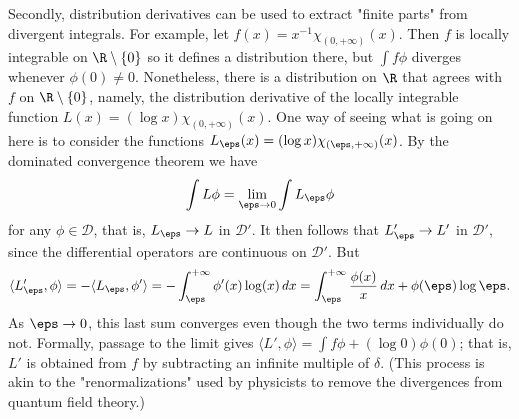 Secondly, distribution derivatives can be used to extract "finite parts" from divergent integrals. For example, let $f(x)=x^{-1}\chi_{(0,+\infty)} (x)$. Then $f$ is locally integrable on $\R\setminus\{0\}$ so it defines a distribution there, but $\int f\phi$ diverges whenever $\phi(0)\neq 0$. Nonetheless, there is a distribution on $\R$ that agrees with $f$ on $\R\setminus\{0\}$, namely, the distribution derivative of the locally integrable function $L(x)=(\log x)\chi_{(0,+\infty)}(x)$. One way of seeing what is going on here is to consider the functions $L_\eps(x)=(\log x)\chi_{(\eps,+\infty)}(x)$. By the dominated convergence theorem we have 
\[\int L\phi=\lim_{\eps\to 0}\int L_\eps\phi\]
for any $\phi\in\mathscr{D}$, that is, $L_\eps\to L$ in $\mathscr{D}'$. It then follows that $L_\eps'\to L'$ in $\mathscr{D}'$, since the differential operators are continuous on $\mathscr{D}'$. But
\[\langle L_\eps',\phi\rangle=-\langle L_\eps,\phi'\rangle=-\int_\eps^{+\infty}\phi'(x)\log(x)\,dx=\int_\eps^{+\infty}\frac{\phi(x)}{x}\,dx+\phi(\eps)\log\eps.\]
As $\eps\to 0$, this last sum converges even though the two terms individually do not. Formally, passage to the limit gives $\langle L',\phi\rangle=\int f\phi+(\log 0)\phi(0)$; that is, $L'$ is obtained from $f$ by subtracting an infinite multiple of $\delta$. (This process is akin to the "renormalizations" used by physicists to remove the divergences from quantum field theory.)

